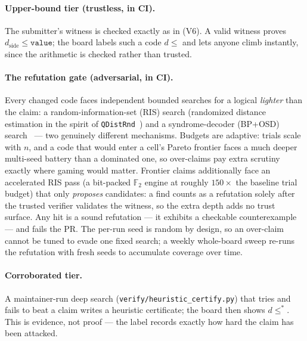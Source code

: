 \documentclass[11pt]{article}
\newcommand{\GF}{\mathbb{F}_2}
\begin{document}
	\paragraph{Upper-bound tier (trustless, in CI).} The submitter's witness
	is checked exactly as in (V6). A valid witness proves
	$d_{\text{side}}\le\texttt{value}$; the board labels such a code $d\le$
	and lets anyone climb instantly, since the arithmetic is checked rather
	than trusted.

	\paragraph{The refutation gate (adversarial, in CI).} Every changed code
	faces independent bounded searches for a logical \emph{lighter} than the
	claim: a random-information-set (RIS) search (randomized distance estimation in
	the spirit of \texttt{QDistRnd}~\cite{pryadko2023qdistrnd}) and a
	syndrome-decoder (BP+OSD) search~\cite{roffe2020decoding} --- two
	genuinely different mechanisms. Budgets are
	adaptive: trials scale with $n$, and a code that would enter a cell's
	Pareto frontier faces a much deeper multi-seed battery than a dominated
	one, so over-claims pay extra scrutiny exactly where gaming would matter.
	Frontier claims additionally face an accelerated RIS pass (a bit-packed
	$\GF$ engine at roughly $150\times$ the baseline trial budget) that only
	\emph{proposes} candidates: a find counts as a refutation solely after
	the trusted verifier validates the witness, so the extra depth adds no
	trust surface. Any hit is a sound refutation --- it exhibits a checkable
	counterexample --- and fails the PR. The per-run seed is random by
	design, so an over-claim cannot be tuned to evade one fixed search; a
	weekly whole-board sweep re-runs the refutation with fresh seeds to
	accumulate coverage over time.

	\paragraph{Corroborated tier.} A maintainer-run deep search
	(\texttt{verify/heuristic\_certify.py}) that tries and fails to beat a
	claim writes a heuristic certificate; the board then shows $d\le^{*}$.
	This is evidence, not proof --- the label records exactly how hard the
	claim has been attacked.
\end{document}
